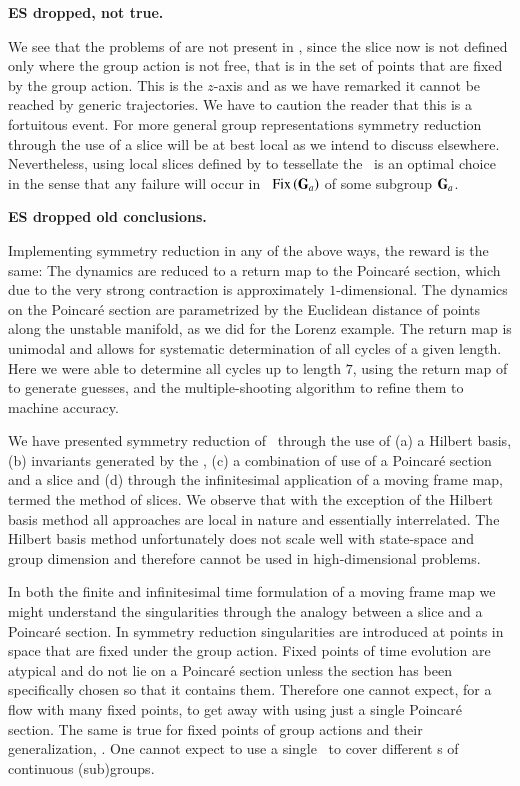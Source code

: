 {\bf ES dropped, not true.}

We see that the problems of
 are not present in , since
the slice now is not defined only where the group action is not free,
that is in the set of points that are fixed by the group action. This
is the $z$-axis and as we have remarked it cannot be reached by generic
trajectories. We have to caution the reader that this is a fortuitous
event. For more general group representations symmetry reduction through
the use of a slice will be at best local as we intend to discuss
elsewhere. Nevertheless, using local slices defined by 
to tessellate the \reducedsp\ is an optimal choice in the sense that any
failure will occur in \fixedsp\ $\mathrm{Fix}\left(\mathbf{G}_a\right)$ of some subgroup
$\mathbf{G}_a$.




{\bf ES dropped old conclusions.}

Implementing symmetry reduction in any of the above ways, the
reward is the same: The dynamics are reduced to a return map
to the Poincar\'e section, which due to the very strong
contraction is approximately $1$-dimensional. The dynamics on
the Poincar\'e section are parametrized by the Euclidean
distance of points along the unstable manifold, as we did for
the Lorenz example. The return map is unimodal and allows for
systematic determination of all cycles of a given length.
Here we were able to determine all cycles up to length $7$,
using the return map of  to generate
guesses, and the multiple-shooting algorithm
to refine them to machine accuracy.

We have presented symmetry reduction of \cLf\ through the use of
(a) a Hilbert basis,  (b) invariants generated by the {\mframes},
(c) a combination of use of a Poincar\'e section and a slice and (d) through
the infinitesimal application of a moving frame map, termed the method of
slices. We observe that with the exception of the Hilbert basis method all
approaches are local in nature and essentially interrelated. The Hilbert basis
method unfortunately does not scale well with state-space and group dimension
and therefore cannot be used in high-dimensional problems.

In both the finite and infinitesimal time formulation of a moving frame map
we might understand the singularities through the analogy between a slice
and a Poincar\'e section. In symmetry reduction singularities
are introduced at points in space that are fixed under the group action.
Fixed points of time evolution are atypical and do not lie on a Poincar\'e section
unless the section has been specifically chosen so that it contains them.
Therefore one cannot expect, for a flow with many fixed points, to
get away with using just a single Poincar\'e section. The same is
true for fixed points of group actions and their generalization, \fixedsp.
One cannot expect to use a single \slice\ to cover different \fixedsp s
of continuous (sub)groups.


